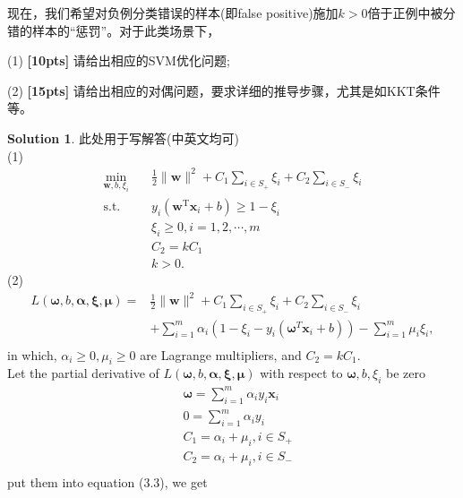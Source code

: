 \documentclass[a4paper,UTF8]{article}
\numberwithin{equation}{section}
\theoremstyle{definition}
\newtheorem*{solution}{Solution}
\begin{document}
现在，我们希望对负例分类错误的样本(即false positive)施加$k>0$倍于正例中被分错的样本的“惩罚”。对于此类场景下，

(1) \textbf{[10pts]} 请给出相应的SVM优化问题;

(2) \textbf{[15pts]} 请给出相应的对偶问题，要求详细的推导步骤，尤其是如KKT条件等。
\begin{solution}
此处用于写解答(中英文均可)\\
(1)\begin{equation}
\begin{split}
\min_{\mathbf{w},b,\xi_i}& \quad \frac{1}{2} \lVert \mathbf{w} \rVert^2 + C_1\sum_{i\in S_+} \xi_i + C_2\sum_{i\in S_-}\xi_i\\
\text{s.t.}&  \quad y_i(\mathbf{w}^\mathrm{T}\mathbf{x}_i + b)\geq 1-\xi_i\\
& \quad \xi_i \geq 0, i = 1,2,\cdots,m\\
& \quad C_2 = k C_1 \\
& \quad k > 0.
\end{split}
\end{equation}
(2)\begin{equation}
\begin{split}
L(\mathbf{\omega},b,\mathbf{\alpha},\mathbf{\xi},\mathbf{\mu})= & \frac{1}{2} \lVert \mathbf{w} \rVert^2 + C_1\sum_{i\in S_+} \xi_i + C_2\sum_{i\in S_-}\xi_i\\
& + \sum_{i=1}^m \alpha_i(1-\xi_i-y_i(\mathbf{\omega}^T\mathbf{x}_i+b))-\sum_{i=1}^{m}\mu_i\xi_i,\\
\end{split}
\end{equation}
in which, $\alpha_i \geq 0, \mu_i\geq 0 $ are Lagrange multipliers, and $C_2 = kC_1$.\\
Let the partial derivative of $L(\mathbf{\omega},b,\mathbf{\alpha},\mathbf{\xi},\mathbf{\mu})$ with respect to $\mathbf{\omega}, b, \xi_i$ be zero\\
\begin{equation}
\begin{split}
& \mathbf{\omega} = \sum_{i=1}^m \alpha_i y_i \mathbf{x}_i \\
& 0 = \sum_{i=1}^m \alpha_i y_i\\
& C_1 = \alpha_i + \mu_i, i\in S_+\\
& C_2 = \alpha_i + \mu_i, i\in S_-\\
\end{split}
\end{equation}
put them into equation (3.3), we get\\

\end{solution}
\end{document}
